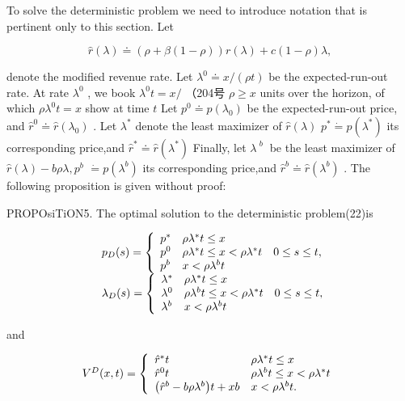 To solve the deterministic problem we need to introduce notation that is
pertinent only to this section. Let

\[
\hat { r } ( \lambda ) \doteq ( \rho + \beta ( 1 - \rho ) ) r ( \lambda ) + c ( 1 - \rho ) \lambda ,
\]

denote the modified revenue rate. Let
\(\lambda ^ { 0 } \doteq x / ( \rho t )\) be the expected-run-out rate.
At rate \(\lambda ^ { 0 }\) , we book \(\lambda ^ { 0 } t = x /\)
（204号 \(\rho \geq x\) units over the horizon, of which
\(\rho \lambda ^ { 0 } t = x\) show at time \(t\) Let
\(p ^ { 0 } \doteq p ( \lambda _ { 0 } )\) be the expected-run-out
price, and \(\hat { r } ^ { 0 } \doteq \hat { r } ( \lambda _ { 0 } )\)
. Let \(\lambda ^ { * }\) denote the least maximizer of
\(\hat { r } ( \lambda )\)
\(p ^ { * } \dot { = } p ( \lambda ^ { * } )\) its corresponding
price,and \(\hat { r } ^ { * } \doteq \hat { r } ( \lambda ^ { * } )\)
Finally, let \(\lambda ^ { \textit { b } }\) be the least maximizer of
\(\hat { r } ( \lambda ) - b \rho \lambda , p ^ { b }\)
\(\dot { = } p ( { \lambda } ^ { b } )\) its corresponding price,and
\(\hat { r } ^ { b } \doteq \hat { r } ( \lambda ^ { b } )\) . The
following proposition is given without proof:

PROPOsiTiON5. The optimal solution to the deterministic problem(22)is

\[
\begin{array} { r l } & { p _ { D } ( s ) = \left\{ \begin{array} { l l } { p ^ { * } } & { \rho \lambda ^ { * } t \leq x } \\ { p ^ { 0 } } & { \rho \lambda ^ { * } t \leq x < \rho \lambda ^ { * } t \quad 0 \leq s \leq t , } \\ { p ^ { b } } & { x < \rho \lambda ^ { b } t } \end{array} \right. } \\ & { \lambda _ { D } ( s ) = \left\{ \begin{array} { l l } { \lambda ^ { * } } & { \rho \lambda ^ { * } t \leq x } \\ { \lambda ^ { 0 } } & { \rho \lambda ^ { b } t \leq x < \rho \lambda ^ { * } t \quad 0 \leq s \leq t , } \\ { \lambda ^ { b } } & { x < \rho \lambda ^ { b } t } \end{array} \right. } \end{array}
\]

and

\[
\begin{array} { r } { V ^ { D } ( x , t ) = \left\{ \begin{array} { l l } { \hat { r } ^ { * } t } & { \rho \lambda ^ { * } t \leq x } \\ { \hat { r } ^ { 0 } t } & { \rho \lambda ^ { b } t \leq x < \rho \lambda ^ { * } t } \\ { \big ( \hat { r } ^ { b } - b \rho \lambda ^ { b } \big ) t + x b } & { x < \rho \lambda ^ { b } t . } \end{array} \right. } \end{array}
\]

